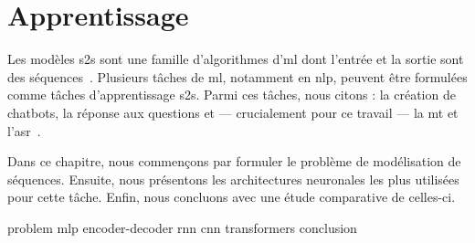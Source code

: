 \chapter{Apprentissage }
\label{chap.s2s}

Les modèles \gls{s2s} sont une famille d'algorithmes d'\gls{ml}
dont l'entrée et la sortie sont des séquences~\cite{Martins_2018}.
Plusieurs tâches de \gls{ml}, notamment en \gls{nlp}, 
peuvent être formulées comme tâches d'apprentissage \gls{s2s}.
Parmi ces tâches, nous citons : la création de chatbots, la réponse aux questions
et --- crucialement pour ce travail --- la \gls{mt} et l'\gls{asr}~\cite{Fathi_2021}.

Dans ce chapitre, nous commençons par formuler le problème de modélisation de séquences.
Ensuite, nous présentons les architectures neuronales les plus utilisées pour cette tâche.
Enfin, nous concluons avec une étude comparative de celles-ci.

{problem}
{mlp}
{encoder-decoder}
{rnn}
{cnn}
{transformers}
{conclusion}
